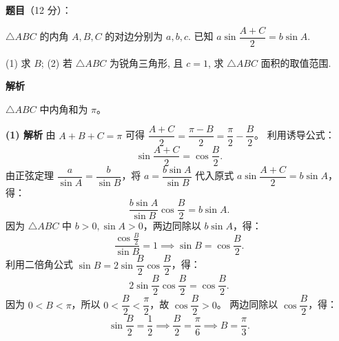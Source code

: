 \begin{answer}

\textbf{题目}（12 分）：

$\triangle ABC$ 的内角 $A, B, C$ 的对边分别为 $a, b, c$. 已知 $a \sin \dfrac{A+C}{2} = b \sin A$.

(1) 求 $B$;  
(2) 若 $\triangle ABC$ 为锐角三角形, 且 $c = 1$, 求 $\triangle ABC$ 面积的取值范围.

\textbf{解析}

$\triangle ABC$ 中内角和为 $\pi$。

\textbf{(1) 解析}
由 $A + B + C = \pi$ 可得 $\dfrac{A+C}{2} = \dfrac{\pi - B}{2} = \dfrac{\pi}{2} - \dfrac{B}{2}$。
利用诱导公式：
\nopagebreak[4]
\[\sin \frac{A+C}{2} = \cos \frac{B}{2}.\]
由正弦定理 $\dfrac{a}{\sin A} = \dfrac{b}{\sin B}$，将 $a = \dfrac{b\sin A}{\sin B}$ 代入原式 $a \sin \dfrac{A+C}{2} = b \sin A$，得：
\nopagebreak[4]
\[\frac{b\sin A}{\sin B} \cos \frac{B}{2} = b \sin A.\]
因为 $\triangle ABC$ 中 $b > 0, \sin A > 0$，两边同除以 $b \sin A$，得：
\nopagebreak[4]
\[\frac{\cos \frac{B}{2}}{\sin B} = 1 \implies \sin B = \cos \frac{B}{2}.\]
利用二倍角公式 $\sin B = 2\sin \dfrac{B}{2}\cos \dfrac{B}{2}$，得：
\nopagebreak[4]
\[2\sin \frac{B}{2}\cos \frac{B}{2} = \cos \frac{B}{2}.\]
因为 $0 < B < \pi$，所以 $0 < \dfrac{B}{2} < \dfrac{\pi}{2}$，故 $\cos \dfrac{B}{2} > 0$。
两边同除以 $\cos \dfrac{B}{2}$，得：
\nopagebreak[4]
\[\sin \frac{B}{2} = \frac{1}{2} \implies \frac{B}{2} = \frac{\pi}{6} \implies B = \frac{\pi}{3}.\]


\end{answer}
